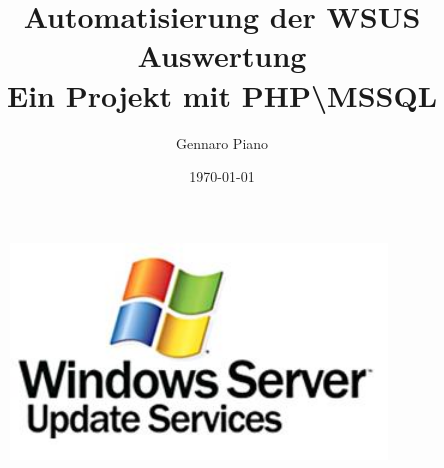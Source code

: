 \documentclass{article}
\begin{document}
\title{Automatisierung der WSUS Auswertung
\\ Ein Projekt mit PHP\textbackslash MSSQL}
\author{Gennaro Piano}
\date{\today}

\maketitle

\begin{figure}[htbp]
		\centering
	\includegraphics[width=10cm]{wsus.jpg}
		\label{fig:logo}
\end{figure}

\newpage
\tableofcontents
\newpage
\end{document}
